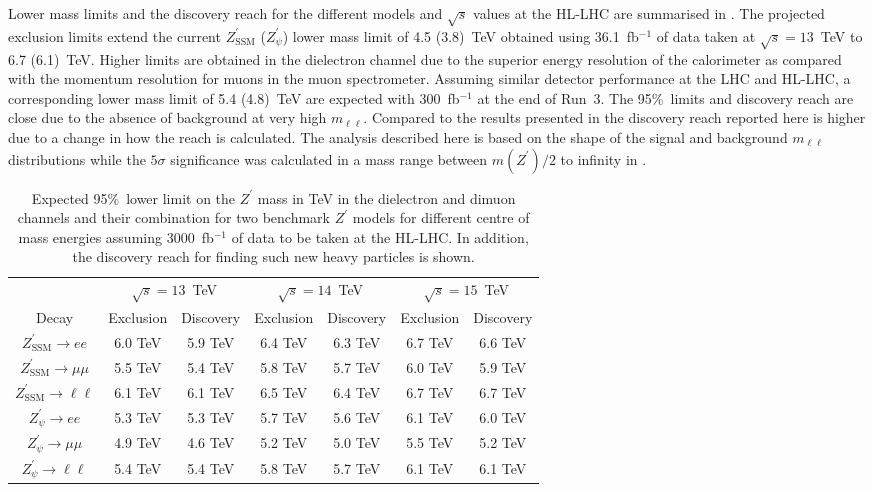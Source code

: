 %
Lower mass limits and the discovery reach for the different models and $\sqrt{s}$ values
at the HL-LHC are summarised in . %
The projected exclusion limits extend the current $Z^\prime_\mathrm{SSM}$ ($Z^\prime_\psi$) lower mass limit of 4.5 (3.8)~TeV
obtained using 36.1~fb$^{-1}$ of data taken at $\sqrt{s} = 13$~TeV to 6.7 (6.1)~TeV.
Higher limits are obtained in the dielectron channel due to the superior energy resolution of
the calorimeter as compared with the momentum resolution for muons in the muon spectrometer.
Assuming similar detector performance at the LHC and HL-LHC, a corresponding lower mass limit of 5.4 (4.8)~TeV are expected with 300~fb$^{-1}$ at the end of Run~3. 
The 95\%~\cl limits and discovery reach are close due to the absence of background at very high $m_{\ell\ell}$.
Compared to the results presented in  the discovery reach reported
here is higher due to a change in how the reach is calculated. The analysis described here
is based on the shape of the signal and background $m_{\ell\ell}$ distributions while the
$5\sigma$ significance was calculated in a mass range between $m(Z^\prime)/2$ to infinity in
.
\begin{table}[!tbp]
  \caption{Expected 95\%~\cl lower limit on the $Z^\prime$ mass in TeV in the dielectron and dimuon channels and their combination for two benchmark $Z^\prime$ models for different centre of mass energies assuming 3000~fb$^{-1}$ of data to be taken at the HL-LHC. In addition, the discovery reach for finding such new heavy particles is shown.}
  \centering
  \begin{tabular}{c|cc|cc|cc}
    \hline
    \hline
    &  \multicolumn{2}{c|}{$\sqrt{s} = 13$~TeV} &  \multicolumn{2}{c|}{$\sqrt{s} = 14$~TeV} &  \multicolumn{2}{c}{$\sqrt{s} = 15$~TeV} \\
    Decay     &  Exclusion & Discovery&  Exclusion& Discovery &  Exclusion & Discovery \\
    \hline
    $Z^\prime_\mathrm{SSM} \to ee$  & 6.0 TeV& 5.9 TeV & 6.4 TeV& 6.3 TeV & 6.7 TeV& 6.6 TeV\\
    $Z^\prime_\mathrm{SSM} \to \mu\mu$& 5.5 TeV& 5.4 TeV& 5.8 TeV& 5.7 TeV& 6.0 TeV& 5.9 TeV\\ \hline
    $Z^\prime_\mathrm{SSM} \to \ell\ell$  & 6.1 TeV& 6.1 TeV&6.5 TeV& 6.4 TeV& 6.7 TeV& 6.7 TeV\\
    \hline
    \hline
    $Z^\prime_\psi \to ee$  & 5.3 TeV& 5.3 TeV& 5.7 TeV& 5.6 TeV & 6.1 TeV& 6.0 TeV\\
    $Z^\prime_\psi \to \mu\mu$& 4.9 TeV & 4.6 TeV& 5.2 TeV& 5.0 TeV& 5.5 TeV& 5.2 TeV\\ \hline
    $Z^\prime_\psi \to \ell\ell$  & 5.4 TeV& 5.4 TeV&5.8 TeV& 5.7 TeV& 6.1 TeV& 6.1 TeV\\
    \hline
    \hline
    
  \end{tabular}
  \label{tab:ATLAS_zplllimits}
\end{table}

